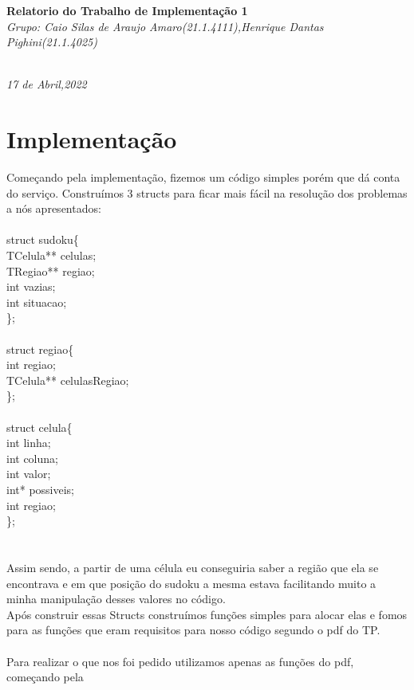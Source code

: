\documentclass{article}
\begin{document}
\begin{center}
\textbf{Relatorio do Trabalho de Implementação 1}
\textit{\\Grupo: Caio Silas de Araujo Amaro(21.1.4111),Henrique Dantas Pighini(21.1.4025)}

\textit{\\17 de Abril,2022}
\end{center} 


\section{Implementação}
Começando pela implementação, fizemos um código simples porém que dá conta do serviço. Construímos 3 structs para ficar mais fácil na resolução dos problemas a nós apresentados:
\\\\struct sudoku\{\\
    TCelula** celulas;\\
    TRegiao** regiao;\\
    int vazias;\\
    int situacao;\\
\};\\
\\
struct regiao\{\\
    int regiao;\\
    TCelula** celulasRegiao;\\
\};\\
\\
struct celula\{\\
    int linha;\\
    int coluna;\\
    int valor;\\
    int* possiveis;\\
    int regiao;\\
\};\\
\\\\
Assim sendo, a partir de uma célula eu conseguiria saber a região que ela se encontrava e em que posição do sudoku a mesma estava facilitando muito a minha manipulação desses valores no código.\\
Após construir essas Structs construímos funções simples para alocar elas e fomos para as funções que eram requisitos para nosso código segundo o pdf do TP.\\
\\
Para realizar o que nos foi pedido utilizamos apenas as funções do pdf, começando pela 
\end{document}
